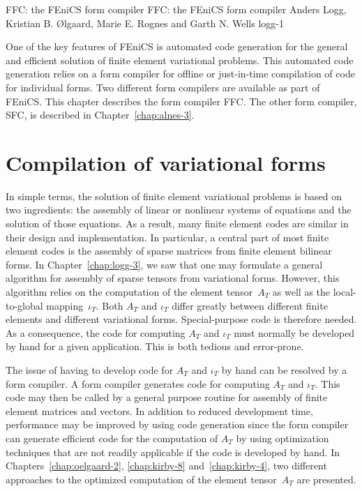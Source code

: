 \begingroup

\setcounter{chapter}{10}
\setcounter{chpnum}{10}

              {FFC: the FEniCS form compiler}
              {FFC: the FEniCS form compiler}
              {Anders Logg, Kristian B. \O{}lgaard, Marie E. Rognes and Garth N. Wells}
              {logg-1}


One of the key features of FEniCS is automated code generation for
the general and efficient solution of finite element variational
problems. This automated code generation relies on a form compiler for
offline or just-in-time compilation of code for individual forms. Two
different form compilers are available as part of FEniCS. This chapter
describes the form compiler FFC. The other form compiler, SFC, is
described in Chapter~\ref{chap:alnes-3}.


\section{Compilation of variational forms}

In simple terms, the solution of finite element variational problems
is based on two ingredients: the assembly of linear or nonlinear
systems of equations and the solution of those equations. As a result,
many finite element codes are similar in their design and
implementation. In particular, a central part of most finite element
codes is the assembly of sparse matrices from finite element bilinear
forms. In Chapter~\ref{chap:logg-3}, we saw that one may formulate a
general algorithm for assembly of sparse tensors from variational
forms. However, this algorithm relies on the computation of the
element tensor~$A_T$ as well as the local-to-global mapping~$\iota_T$.
Both $A_T$ and $\iota_T$ differ greatly between different finite
elements and different variational forms. Special-purpose code is
therefore needed. As a consequence, the code for computing $A_T$ and
$\iota_T$ must normally be developed by hand for a given
application. This is both tedious and error-prone.


The issue of having to develop code for $A_T$ and $\iota_T$ by hand
can be resolved by a form compiler. A form compiler generates code for
computing $A_T$ and $\iota_T$. This code may then be called by a
general purpose routine for assembly of finite element matrices and
vectors. In addition to reduced development time, performance may be
improved by using code generation since the form compiler can generate
efficient code for the computation of $A_T$ by using optimization
techniques that are not readily applicable if the code is developed by
hand. In Chapters~\ref{chap:oelgaard-2}, \ref{chap:kirby-8}
and~\ref{chap:kirby-4}, two different approaches to the optimized
computation of the element tensor~$A_T$ are presented.

